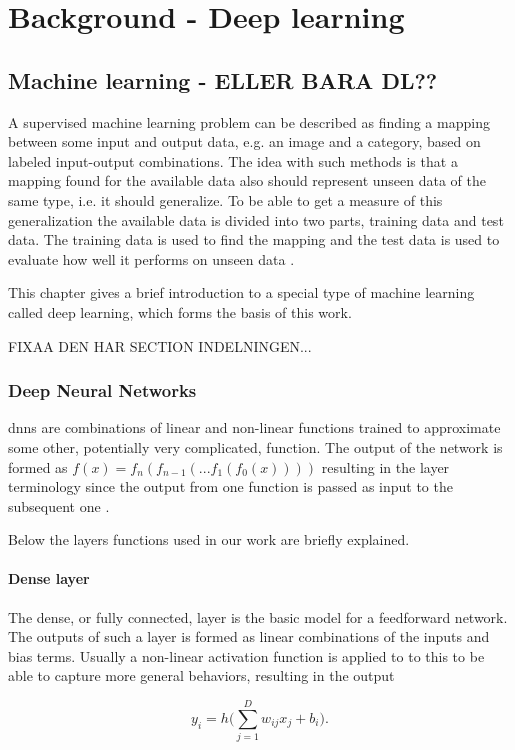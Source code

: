 \chapter{Background - Deep learning}

\section{Machine learning - ELLER BARA DL??} \label{sec:ML}
A supervised machine learning problem can be described as finding a mapping between some input and output data, e.g. an image and a category, based on labeled input-output combinations. The idea with such methods is that a mapping found for the available data also should represent unseen data of the same type, i.e. it should generalize. To be able to get a measure of this generalization the available data is divided into two parts, training data and test data. The training data is used to find the mapping and the test data is used to evaluate how well it performs on unseen data \cite{Bishop2006}.

This chapter gives a brief introduction to a special type of machine learning called deep learning, which forms the basis of this work.

FIXAA DEN HAR SECTION INDELNINGEN...
\subsection{Deep Neural Networks}
\glspl{dnn} are combinations of linear and non-linear functions trained to approximate some other, potentially very complicated, function. The output of the network is formed as $f(x) = f_n(f_{n-1}(... f_1(f_0(x))))$ resulting in the layer terminology since the output from one function is passed as input to the subsequent one \cite{Goodfellow2016}.

 Below the layers functions used in our work are briefly explained.

\subsubsection{Dense layer}
The dense, or fully connected, layer is the basic model for a feedforward network. The outputs of such a layer is formed as linear combinations of the inputs and bias terms. Usually a non-linear activation function is applied to to this to be able to capture more general behaviors, resulting in the output

\begin{equation}
    y_i = h\Big( \sum_{j=1}^D w_{ij}x_j + b_i \Big).
    \label{eq:dense}
\end{equation}


